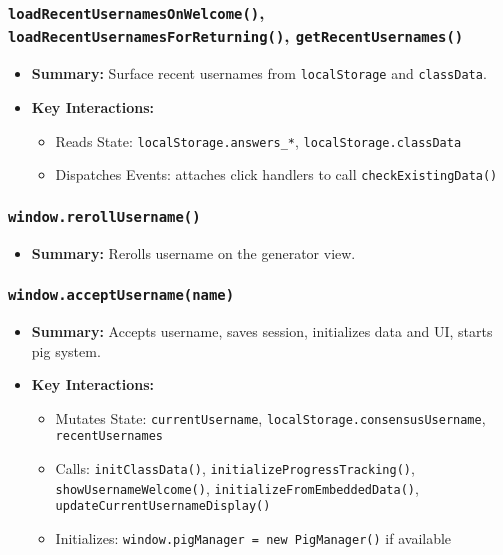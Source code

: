 \documentclass[11pt,letterpaper]{article}
\begin{document}
\subsubsection{\texttt{loadRecentUsernamesOnWelcome()}, \texttt{loadRecentUsernamesForReturning()}, \texttt{getRecentUsernames()}}
\begin{itemize}
    \item \textbf{Summary:} Surface recent usernames from \texttt{localStorage} and \texttt{classData}.
    \item \textbf{Key Interactions:}
    \begin{itemize}
        \item Reads State: \texttt{localStorage.answers\_*}, \texttt{localStorage.classData}
        \item Dispatches Events: attaches click handlers to call \texttt{checkExistingData()}
    \end{itemize}
\end{itemize}

\subsubsection{\texttt{window.rerollUsername()}}
\begin{itemize}
    \item \textbf{Summary:} Rerolls username on the generator view.
\end{itemize}

\subsubsection{\texttt{window.acceptUsername(name)}}
\begin{itemize}
    \item \textbf{Summary:} Accepts username, saves session, initializes data and UI, starts pig system.
    \item \textbf{Key Interactions:}
    \begin{itemize}
        \item Mutates State: \texttt{currentUsername}, \texttt{localStorage.consensusUsername}, \texttt{recentUsernames}
        \item Calls: \texttt{initClassData()}, \texttt{initializeProgressTracking()}, \texttt{showUsernameWelcome()}, \texttt{initializeFromEmbeddedData()}, \texttt{updateCurrentUsernameDisplay()}
        \item Initializes: \texttt{window.pigManager = new PigManager()} if available
    \end{itemize}
\end{itemize}
\end{document}
